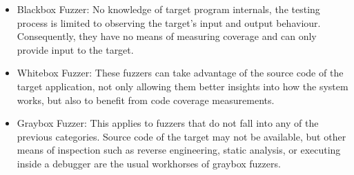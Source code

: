 \begin{itemize}
    \item Blackbox Fuzzer: No knowledge of target program internals, the testing process is limited to observing the target's input and output behaviour. Consequently, they have no means of measuring coverage and can only provide input to the target.
    \item Whitebox Fuzzer: These fuzzers can take advantage of the source code of the target application, not only allowing them better insights into how the system works, but also to benefit from code coverage measurements.
    \item Graybox Fuzzer: This applies to fuzzers that do not fall into any of the previous categories. Source code of the target may not be available, but other means of inspection such as reverse engineering, static analysis, or executing inside a debugger are the usual workhorses of graybox fuzzers\cite{mcnallyFuzzingStateArt2012}.
\end{itemize}





